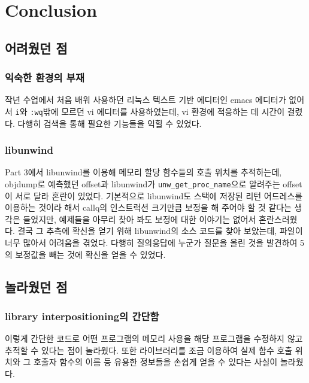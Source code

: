 \documentclass{report}
\begin{document}
\section{Conclusion}
\subsection{어려웠던 점}
\subsubsection{익숙한 환경의 부재}
작년 수업에서 처음 배워 사용하던 리눅스 텍스트 기반 에디터인 emacs 에디터가 없어서 \lstinline{i}와 \lstinline{:wq}밖에 모르던 vi 에디터를 사용하였는데, vi 환경에 적응하는 데 시간이 걸렸다. 다행히 검색을 통해 필요한 기능들을 익힐 수 있었다.

\subsubsection{libunwind}
Part 3에서 libunwind를 이용해 메모리 할당 함수들의 호출 위치를 추적하는데, objdump로 예측했던 offset과 libunwind가 \lstinline{unw_get_proc_name}으로 알려주는 offset이 서로 달라 혼란이 있었다. 기본적으로 libunwind도 스택에 저장된 리턴 어드레스를 이용하는 것이라 해서 callq의 인스트럭션 크기만큼 보정을 해 주어야 할 것 같다는 생각은 들었지만, 예제들을 아무리 찾아 봐도 보정에 대한 이야기는 없어서 혼란스러웠다. 결국 그 추측에 확신을 얻기 위해 libunwind의 소스 코드를 찾아 보았는데, 파일이 너무 많아서 어려움을 겪었다. 다행히 질의응답에 누군가 질문을 올린 것을 발견하여 5의 보정값을 빼는 것에 확신을 얻을 수 있었다.
\subsection{놀라웠던 점}
\subsubsection{library interpositioning의 간단함}
이렇게 간단한 코드로 어떤 프로그램의 메모리 사용을 해당 프로그램을 수정하지 않고 추적할 수 있다는 점이 놀라웠다. 또한 라이브러리를 조금 이용하여 실제 함수 호출 위치와 그 호출자 함수의 이름 등 유용한 정보들을 손쉽게 얻을 수 있다는 사실이 놀라웠다.
\end{document}

